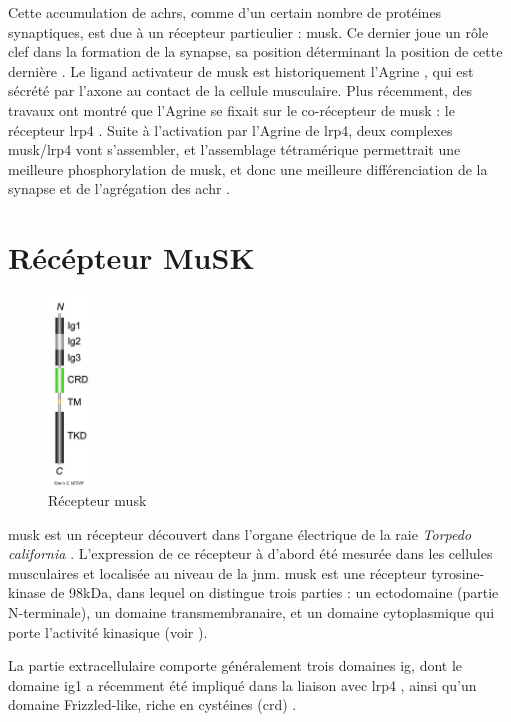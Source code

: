 	Cette accumulation de \glspl{achr}, comme d'un certain nombre de protéines synaptiques, est due à un récepteur particulier : \gls{musk}. Ce dernier joue un rôle clef dans la formation de la synapse, sa position déterminant la position de cette dernière \cite{DeChiara1996, Glass1996}. Le ligand activateur de \gls{musk} est historiquement l'Agrine \cite{Glass1996}, qui est sécrété par l'axone au contact de la cellule musculaire. Plus récemment, des travaux ont montré que l'Agrine se fixait sur le co-récepteur de \gls{musk} : le récepteur \gls{lrp}4 \cite{Zhang2008, Kim2008}. Suite à l'activation par l'Agrine de \gls{lrp}4, deux complexes \gls{musk}/\gls{lrp}4 vont s'assembler, et l'assemblage tétramérique permettrait une meilleure phosphorylation de \gls{musk}, et donc une meilleure différenciation de la synapse et de l'agrégation des \gls{achr} \cite{Zong2012}.
	
\section{Récépteur MuSK}
	\label{sec:IntroMuSK}
	
	\begin{figure}
		\includegraphics[width=0.1\textwidth]{./Images/MuSKReceptor.png}	
		\caption{Récepteur \gls{musk}}
		\label{fig:RMuSK}
	\end{figure}

	\gls{musk} est un récepteur découvert dans l'organe électrique de la raie \emph{Torpedo california} \cite{Jennings1993}. L'expression de ce récepteur à d'abord été mesurée dans les cellules musculaires et localisée au niveau de la \gls{jnm}. \gls{musk} est une récepteur tyrosine-kinase de 98kDa, dans lequel on distingue trois parties : un ectodomaine (partie N-terminale), un domaine transmembranaire, et un domaine cytoplasmique qui porte l'activité kinasique (voir ). 
	
	La partie extracellulaire comporte généralement trois domaines \gls{ig}, dont le domaine \gls{ig}1 a récemment été impliqué dans la liaison avec \gls{lrp}4 \cite{Zhang2011}, ainsi qu'un domaine Frizzled-like, riche en cystéines (\gls{crd}) \cite{Jing2009}.
	
